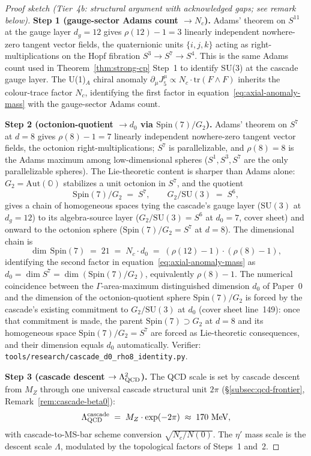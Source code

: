 \documentclass[12pt,a4paper]{article}
\begin{document}
\begin{proof}[Proof sketch (Tier~4b: structural argument with acknowledged gaps; see remark below)]
\textbf{Step 1 (gauge-sector Adams count $\to N_c$).} Adams' theorem on $S^{11}$ at the gauge layer $d_g = 12$ gives $\rho(12) - 1 = 3$ linearly independent nowhere-zero tangent vector fields, the quaternionic units $\{i, j, k\}$ acting as right-multiplications on the Hopf fibration $S^3 \to S^7 \to S^4$. This is the same Adams count used in Theorem~\ref{thm:strong-cp} Step~1 to identify SU(3) at the cascade gauge layer. The U(1)$_{\!A}$ chiral anomaly $\partial_\mu J^\mu_5 \propto N_c \cdot \mathrm{tr}(F\wedge F)$ inherits the colour-trace factor $N_c$, identifying the first factor in equation~\eqref{eq:axial-anomaly-mass} with the gauge-sector Adams count.

\textbf{Step 2 (octonion-quotient $\to d_0$ via $\mathrm{Spin}(7)/G_2$).} Adams' theorem on $S^7$ at $d=8$ gives $\rho(8) - 1 = 7$ linearly independent nowhere-zero tangent vector fields, the octonion right-multiplications; $S^7$ is parallelizable, and $\rho(8) = 8$ is the Adams maximum among low-dimensional spheres ($S^1, S^3, S^7$ are the only parallelizable spheres). The Lie-theoretic content is sharper than Adams alone: $G_2 = \mathrm{Aut}(\mathbb{O})$ stabilizes a unit octonion in $S^7$, and the quotient
\[
\mathrm{Spin}(7)/G_2 \;=\; S^7,
\qquad
G_2/\mathrm{SU}(3) \;=\; S^6,
\]
gives a chain of homogeneous spaces tying the cascade's gauge layer ($\mathrm{SU}(3)$ at $d_g=12$) to its algebra-source layer ($G_2/\mathrm{SU}(3) = S^6$ at $d_0=7$, cover sheet) and onward to the octonion sphere ($\mathrm{Spin}(7)/G_2 = S^7$ at $d=8$). The dimensional chain is
\[
\dim\,\mathrm{Spin}(7) \;=\; 21 \;=\; N_c\cdot d_0
\;=\; (\rho(12)-1)\cdot(\rho(8)-1),
\]
identifying the second factor in equation~\eqref{eq:axial-anomaly-mass} as $d_0 = \dim S^7 = \dim(\mathrm{Spin}(7)/G_2)$, equivalently $\rho(8)-1$. The numerical coincidence between the $\Gamma$-area-maximum distinguished dimension $d_0$ of Paper~0 and the dimension of the octonion-quotient sphere $\mathrm{Spin}(7)/G_2$ is forced by the cascade's existing commitment to $G_2/\mathrm{SU}(3)$ at $d_0$ (cover sheet line~149): once that commitment is made, the parent $\mathrm{Spin}(7)\supset G_2$ at $d=8$ and its homogeneous space $\mathrm{Spin}(7)/G_2 = S^7$ are forced as Lie-theoretic consequences, and their dimension equals $d_0$ automatically. Verifier: \texttt{tools/research/cascade\_d0\_rho8\_identity.py}.

\textbf{Step 3 (cascade descent $\to \Lambda_{\rm QCD}^2$).} The QCD scale is set by cascade descent from $M_Z$ through one universal cascade structural unit $2\pi$ (\S\ref{subsec:qcd-frontier}, Remark~\ref{rem:cascade-beta0}):
\[
\Lambda_{\rm QCD}^{\rm cascade} \;=\; M_Z \cdot \exp(-2\pi) \;\approx\; 170~\text{MeV},
\]
with cascade-to-MS-bar scheme conversion $\sqrt{N_c/N(0)}$. The $\eta'$ mass scale is the descent scale $\Lambda$, modulated by the topological factors of Steps~1 and~2.


\end{proof}
\end{document}
